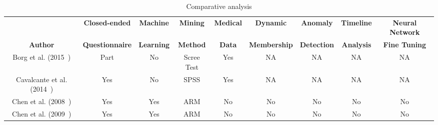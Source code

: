 


\newpage

\changepage{}{}{-1.8cm}{-1.8cm}{}{}{}{}{}

\begin{landscape}
    \begin{table}[htbp]
        \begin{adjustwidth}{-2cm}{}
            \caption{Comparative analysis}
            \label{tab:TBL_Comparative_Analisys}
            \centering
            \small
            \setlength\tabcolsep{2pt}
            \begin{tabular}{|c|c|c|c|c|c|c|c|c|}
                \hline
                                                                         & \textbf{Closed-ended}  & \textbf{Machine}  & \textbf{Mining}     & \textbf{Medical} & \textbf{Dynamic}    & \textbf{Anomaly}   & \textbf{Timeline} & \textbf{Neural Network} \\
                \textbf{Author}                                          & \textbf{Questionnaire} & \textbf{Learning} & \textbf{Method}     & \textbf{Data}    & \textbf{Membership} & \textbf{Detection} & \textbf{Analysis} & \textbf{Fine Tuning}    \\
                \hline
                Borg et al. (2015~\cite{borg2015development})            & Part                   & No                & Scree Test          & Yes              & NA                  & NA                 & NA                & NA                      \\
                \hline
                Cavalcante et al. (2014~\cite{cavalcante2014low})        & Yes                    & No                & SPSS                & Yes              & NA                  & NA                 & NA                & NA                      \\
                \hline
                Chen et al. (2008~\cite{chen2008mining})                 & Yes                    & Yes               & ARM                 & No               & No                  & No                 & No                & No                      \\
                \hline
                Chen et al. (2009~\cite{chen2009mining})                 & Yes                    & Yes               & ARM                 & No               & No                  & No                 & No                & No                      \\

\end{tabular}
\end{adjustwidth}
\end{table}
\end{landscape}
